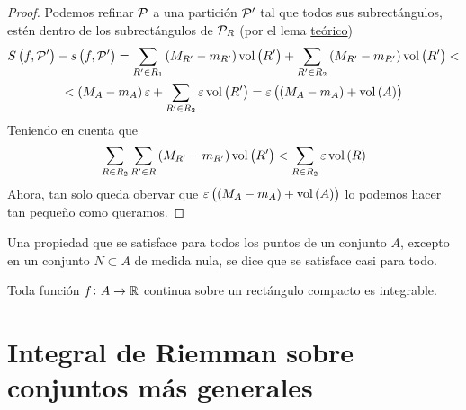 \begin{proof}
    Podemos refinar $\mathcal{P}$ a una partición $\mathcal{P}^\prime$ tal que todos sus
    subrectángulos, est\'en dentro de los subrectángulos de $\mathcal{P}_R$ (por el lema
    \hyperref[lema:teo_lebesgue]{teórico})
    \begin{gather*}
        S\left( f, \mathcal{P}^\prime \right) - s\left( f, \mathcal{P}^\prime \right) =
        \sum_{R^\prime \in R_1} \left( M_{R^\prime} - m_{R^\prime} \right)
        \operatorname{vol} \left( R^\prime \right) + \sum_{R^\prime \in R_2}
        \left( M_{R^\prime} - m_{R^\prime}\right) \operatorname{vol}\left( R^\prime \right)
        < \\ < \left( M_A - m_A \right)\varepsilon + \sum_{R^\prime \in R_2}
        \varepsilon \operatorname{vol}\left( R^\prime \right) = \varepsilon \left(
        \left( M_A - m_A \right) + \operatorname{vol} \left( A \right)\right)
    \end{gather*}
    Teniendo en cuenta que
    \[
        \sum_{R \in R_2} \sum_{R^\prime \in R} \left( M_{R^\prime} -
        m_{R^\prime}\right) \operatorname{vol}\left( R^\prime \right) < \sum_{R \in R_2}
        \varepsilon \operatorname{vol}\left( R \right)
    \]
    Ahora, tan solo queda obervar que $\varepsilon \left( \left( M_A - m_A \right)
    + \operatorname{vol} \left( A \right)\right)$ lo podemos hacer tan pequeño como queramos.
\end{proof}

\begin{defi}
    Una propiedad que se satisface para todos los puntos de un conjunto $A$,
    excepto en un conjunto $N \subset A$ de medida nula, se dice que se satisface
    casi para todo.
\end{defi}

\begin{prop}
    Toda función $f \colon A \to \mathbb{R}$ continua sobre un rectángulo compacto es
    integrable.
\end{prop}

\section{Integral de Riemman sobre conjuntos más generales}

